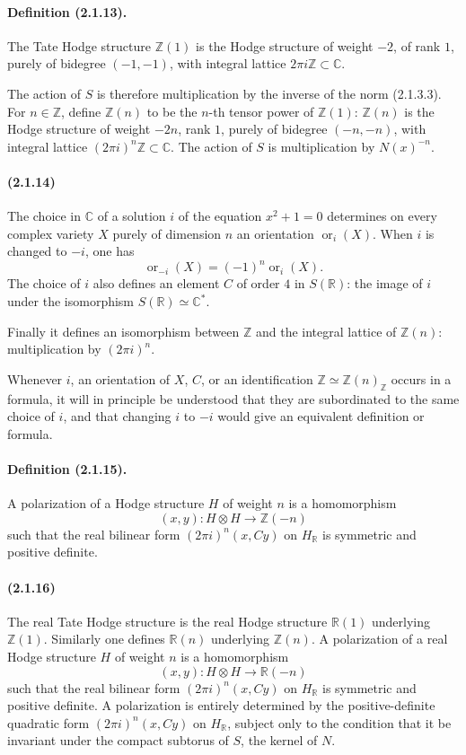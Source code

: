 \documentclass[10pt]{article}
\newcommand{\C}{\mathbb C}
\newcommand{\Z}{\mathbb Z}
\newcommand{\R}{\mathbb R}
\newcommand{\ornt}{\operatorname{or}}
\begin{document}
\paragraph{Definition (2.1.13).} The Tate Hodge structure $\Z(1)$ is the Hodge structure of weight $-2$, of rank $1$, purely of bidegree $(-1,-1)$, with integral lattice $2\pi i\Z\subset\C$.

The action of $S$ is therefore multiplication by the inverse of the norm (2.1.3.3). For $n\in\Z$, define $\Z(n)$ to be the $n$-th tensor power of $\Z(1)$: $\Z(n)$ is the Hodge structure of weight $-2n$, rank $1$, purely of bidegree $(-n,-n)$, with integral lattice $(2\pi i)^n\Z\subset\C$. The action of $S$ is multiplication by $N(x)^{-n}$.

\paragraph{(2.1.14)} The choice in $\C$ of a solution $i$ of the equation $x^2+1=0$ determines on every complex variety $X$ purely of dimension $n$ an orientation $\ornt_i(X)$. When $i$ is changed to $-i$, one has
\[
\ornt_{-i}(X)=(-1)^n\ornt_i(X).
\]
The choice of $i$ also defines an element $C$ of order $4$ in $S(\R)$: the image of $i$ under the isomorphism $S(\R)\simeq\C^*$.

Finally it defines an isomorphism between $\Z$ and the integral lattice of $\Z(n)$: multiplication by $(2\pi i)^n$.

Whenever $i$, an orientation of $X$, $C$, or an identification $\Z\simeq\Z(n)_\Z$ occurs in a formula, it will in principle be understood that they are subordinated to the same choice of $i$, and that changing $i$ to $-i$ would give an equivalent definition or formula.

\paragraph{Definition (2.1.15).} A polarization of a Hodge structure $H$ of weight $n$ is a homomorphism
\[
(x,y):H\otimes H\longrightarrow\Z(-n)
\]
such that the real bilinear form $(2\pi i)^n(x,Cy)$ on $H_\R$ is symmetric and positive definite.

\paragraph{(2.1.16)} The real Tate Hodge structure is the real Hodge structure $\R(1)$ underlying $\Z(1)$. Similarly one defines $\R(n)$ underlying $\Z(n)$. A polarization of a real Hodge structure $H$ of weight $n$ is a homomorphism
\[
(x,y):H\otimes H\longrightarrow\R(-n)
\]
such that the real bilinear form $(2\pi i)^n(x,Cy)$ on $H_\R$ is symmetric and positive definite. A polarization is entirely determined by the positive-definite quadratic form $(2\pi i)^n(x,Cy)$ on $H_\R$, subject only to the condition that it be invariant under the compact subtorus of $S$, the kernel of $N$.
\end{document}
